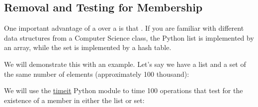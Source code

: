 \subsection{Removal and Testing for Membership}
\label{\detokenize{lesson/prg/python_intro:removal-and-testing-for-membership}}
One important advantage of a  over a  is that . If you are familiar with different data structures
from a Computer Science class, the Python list is implemented by an
array, while the set is implemented by a hash table.

We will demonstrate this with an example. Let's say we have a list and
a set of the same number of elements (approximately 100 thousand):

\begin{sphinxVerbatim}[commandchars=\\\{\}]
   
  \PYG{p}{[}     \PYG{p}{]}
  
\end{sphinxVerbatim}

We will use the \href{https://docs.python.org/2/library/timeit.html}{timeit} Python module to
time 100 operations that test for the existence of a member in either
the list or set:

\begin{sphinxVerbatim}[commandchars=\\\{\}]
    
    
\end{sphinxVerbatim}

